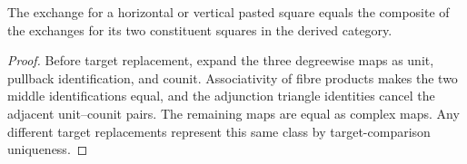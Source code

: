 \begin{lemma}
\label{lemma:weil-pbc-derived-exchange-pasting-v5}
The exchange for a horizontal or vertical pasted square equals the composite
of the exchanges for its two constituent squares in the derived category.
\end{lemma}
\begin{proof}
Before target replacement, expand the three degreewise maps as unit,
pullback identification, and counit.  Associativity of fibre products makes
the two middle identifications equal, and the adjunction triangle identities
cancel the adjacent unit--counit pairs.  The remaining maps are equal as
complex maps.  Any different target replacements represent this same class by
target-comparison uniqueness.
\end{proof}

